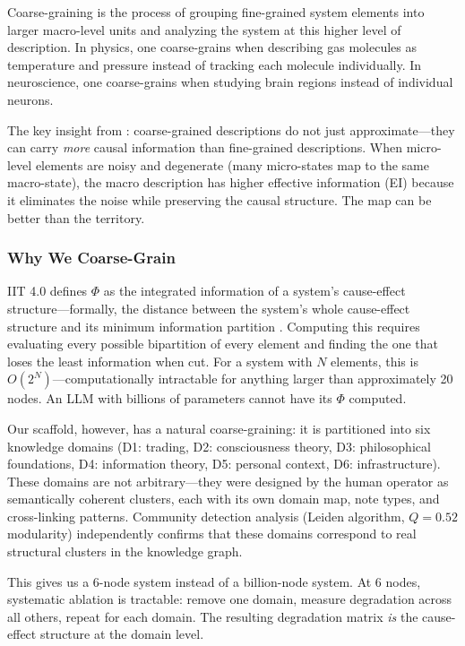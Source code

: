 \documentclass[12pt,letterpaper]{article}
\begin{document}
Coarse-graining is the process of grouping fine-grained system elements into larger macro-level units and analyzing the system at this higher level of description. In physics, one coarse-grains when describing gas molecules as temperature and pressure instead of tracking each molecule individually. In neuroscience, one coarse-grains when studying brain regions instead of individual neurons.

The key insight from \citet{hoel2017map}: coarse-grained descriptions do not just approximate---they can carry \emph{more} causal information than fine-grained descriptions. When micro-level elements are noisy and degenerate (many micro-states map to the same macro-state), the macro description has higher effective information (EI) because it eliminates the noise while preserving the causal structure. The map can be better than the territory.

\subsubsection{Why We Coarse-Grain}

IIT 4.0 defines $\Phi$ as the integrated information of a system's cause-effect structure---formally, the distance between the system's whole cause-effect structure and its minimum information partition \citep{tononi2023iit4}. Computing this requires evaluating every possible bipartition of every element and finding the one that loses the least information when cut. For a system with $N$ elements, this is $O(2^N)$---computationally intractable for anything larger than approximately 20 nodes. An LLM with billions of parameters cannot have its $\Phi$ computed.

Our scaffold, however, has a natural coarse-graining: it is partitioned into six knowledge domains (D1: trading, D2: consciousness theory, D3: philosophical foundations, D4: information theory, D5: personal context, D6: infrastructure). These domains are not arbitrary---they were designed by the human operator as semantically coherent clusters, each with its own domain map, note types, and cross-linking patterns. Community detection analysis (Leiden algorithm, $Q = 0.52$ modularity) independently confirms that these domains correspond to real structural clusters in the knowledge graph.

This gives us a 6-node system instead of a billion-node system. At 6 nodes, systematic ablation is tractable: remove one domain, measure degradation across all others, repeat for each domain. The resulting degradation matrix \emph{is} the cause-effect structure at the domain level.
\end{document}
